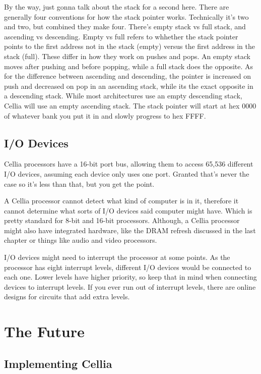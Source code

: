 \documentclass[letterpaper,12pt]{book}
\begin{document}
By the way, just gonna talk about the stack for a second here. There are generally four conventions for how the stack pointer works. Technically it's two and two, but combined they make four. There's empty stack vs full stack, and ascending vs descending. Empty vs full refers to whhether the stack pointer points to the first address not in the stack (empty) versus the first address in the stack (full). These differ in how they work on pushes and pops. An empty stack moves after pushing and before popping, while a full stack does the opposite. As for the difference between ascending and descending, the pointer is increased on push and decreased on pop in an ascending stack, while its the exact opposite in a descending stack. While most architectures use an empty descending stack, Cellia will use an empty ascending stack. The stack pointer will start at hex 0000 of whatever bank you put it in and slowly progress to hex FFFF.

\chapter{I/O Devices}

Cellia processors have a 16-bit port bus, allowing them to access 65,536 different I/O devices, assuming each device only uses one port. Granted that's never the case so it's less than that, but you get the point.

A Cellia processor cannot detect what kind of computer is in it, therefore it cannot determine what sorts of I/O devices said computer might have. Which is pretty standard for 8-bit and 16-bit processors. Although, a Cellia processor might also have integrated hardware, like the DRAM refresh discussed in the last chapter or things like audio and video processors.

I/O devices might need to interrupt the processor at some points. As the processor has eight interrupt levels, different I/O devices would be connected to each one. Lower levels have higher priority, so keep that in mind when connecting devices to interrupt levels. If you ever run out of interrupt levels, there are online designs for circuits that add extra levels.

\part{The Future}

\chapter{Implementing Cellia}
\end{document}
